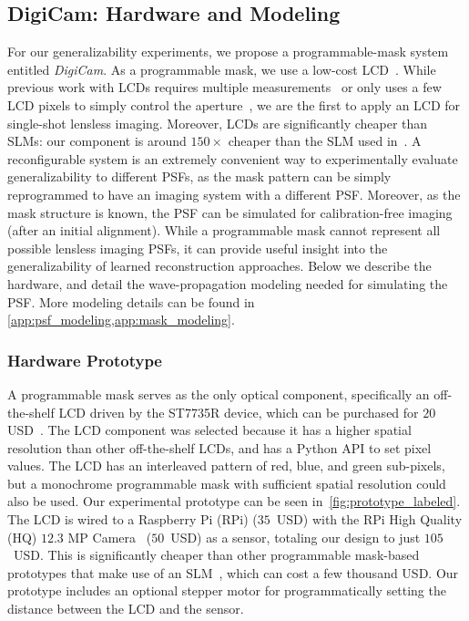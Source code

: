 \subsection{DigiCam: Hardware and Modeling}
\label{sec:digicam}

\noindent For our generalizability experiments, we propose a programmable-mask system entitled \textit{DigiCam}. 
As a programmable mask, we use a low-cost LCD~\cite{adafruitlcd}.
While previous work with LCDs requires multiple measurements~\cite{4472247,huang2013}
or only uses a few LCD pixels to simply control the aperture~\cite{zomet2006},
we are the first to apply an LCD for single-shot lensless imaging.
Moreover, LCDs are significantly cheaper than SLMs: our component is around $150\times$ cheaper than the SLM used in~\cite{sweepcam2020,zheng2021programmable3dcam}.
A reconfigurable system is an extremely convenient way to experimentally evaluate generalizability to different PSFs, as the mask pattern can be simply reprogrammed to have an imaging system with a different PSF.
Moreover, as the mask structure is known, the PSF can be simulated for calibration-free imaging (after an initial alignment).
While a programmable mask cannot represent all possible lensless imaging PSFs, it can provide useful insight into the generalizability of learned reconstruction approaches.
Below we describe the hardware, and detail the wave-propagation modeling needed for simulating the PSF.
More modeling details can be found in \cref{app:psf_modeling,app:mask_modeling}.


\subsubsection{Hardware Prototype}



\noindent A programmable mask serves as the only optical component, 
specifically an off-the-shelf LCD driven by the ST7735R device,
which can be purchased for $20$ USD~\cite{adafruitlcd}.
The LCD component was selected because it has a higher spatial resolution than other off-the-shelf LCDs,
and has a Python API to set pixel values.
The LCD has an interleaved pattern of red, blue, and green sub-pixels, 
but a monochrome programmable mask with sufficient spatial resolution could also be used.
Our experimental prototype can be seen in~\cref{fig:prototype_labeled}.
The LCD is wired to a Raspberry Pi (RPi) ($35$~USD) with the RPi High Quality (HQ) $12.3$ MP Camera~\cite{rpi_hq} ($50$~USD) as a sensor,
totaling our design to just $105$~USD. 
This is significantly cheaper than other programmable mask-based prototypes that make use of an SLM~\cite{sweepcam2020,zheng2021programmable3dcam}, 
which can cost a few thousand USD.
Our prototype includes an optional stepper motor for programmatically setting the distance between the LCD and the sensor.

